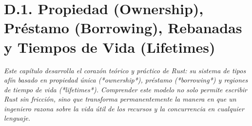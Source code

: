 \documentclass{book}
\begin{document}
\chapter{D.1. Propiedad (Ownership), Préstamo (Borrowing), Rebanadas y Tiempos de Vida (Lifetimes)}
\label{chap:cap03-ownership-borrowing-lifetimes-modelo-memoria}

\noindent\textit{Este capítulo desarrolla el corazón teórico y práctico de Rust: su sistema de tipos afín basado en propiedad única (*ownership*), préstamo (*borrowing*) y regiones de tiempo de vida (*lifetimes*). Comprender este modelo no solo permite escribir Rust sin fricción, sino que transforma permanentemente la manera en que un ingeniero razona sobre la vida útil de los recursos y la concurrencia en cualquier lenguaje.}
\end{document}
